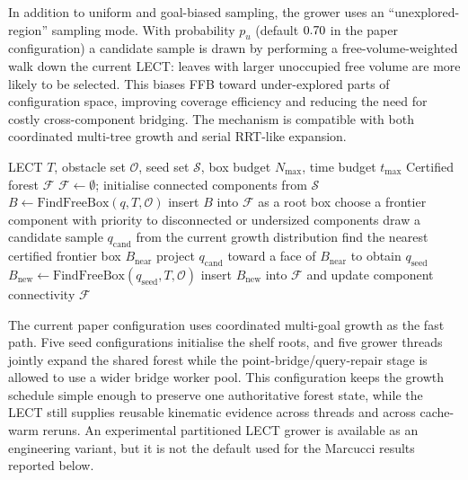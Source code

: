 \documentclass[journal]{IEEEtran}
\newcommand{\calO}{\ensuremath{\mathcal{O}}}
\begin{document}
In addition to uniform and goal-biased sampling, the grower uses an
``unexplored-region'' sampling mode. With probability $p_u$ (default
$0.70$ in the paper configuration) a candidate sample is drawn by
performing a free-volume-weighted walk down the current LECT: leaves with
larger unoccupied free volume are more likely to be selected. This biases FFB
toward under-explored parts of configuration space, improving coverage
efficiency and reducing the need for costly cross-component bridging. The
mechanism is compatible with both coordinated multi-tree growth and serial
RRT-like expansion.

\begin{algorithm}[t]
\caption{Certified Forest Growth}
\label{alg:forest_growth}
\footnotesize
\begin{algorithmic}[1]
\REQUIRE LECT $T$, obstacle set $\calO$, seed set $\mathcal{S}$, box budget $N_{\max}$, time budget $t_{\max}$
\ENSURE Certified forest $\mathcal{F}$
\STATE $\mathcal{F} \gets \emptyset$; initialise connected components from $\mathcal{S}$
  \STATE $B \gets \text{FindFreeBox}(q, T, \calO)$
    \STATE insert $B$ into $\mathcal{F}$ as a root box
  \ENDIF
\ENDFOR
{}
  \STATE choose a frontier component with priority to disconnected or undersized components
  \STATE draw a candidate sample $q_{\mathrm{cand}}$ from the current growth distribution
  \STATE find the nearest certified frontier box $B_{\mathrm{near}}$
  \STATE project $q_{\mathrm{cand}}$ toward a face of $B_{\mathrm{near}}$ to obtain $q_{\mathrm{seed}}$
  \STATE $B_{\mathrm{new}} \gets \text{FindFreeBox}(q_{\mathrm{seed}}, T, \calO)$
    \STATE insert $B_{\mathrm{new}}$ into $\mathcal{F}$ and update component connectivity
  \ENDIF
\ENDWHILE
\STATE \RETURN $\mathcal{F}$
\end{algorithmic}
\end{algorithm}

The current paper configuration uses coordinated multi-goal growth as the fast
path. Five seed configurations initialise the shelf roots, and five grower
threads jointly expand the shared forest while the point-bridge/query-repair
stage is allowed to use a wider bridge worker pool. This configuration keeps the
growth schedule simple enough to preserve one authoritative forest state, while
the LECT still supplies reusable kinematic evidence across threads and across
cache-warm reruns. An experimental partitioned LECT grower is available as an
engineering variant, but it is not the default used for the Marcucci results
reported below.
\end{document}
